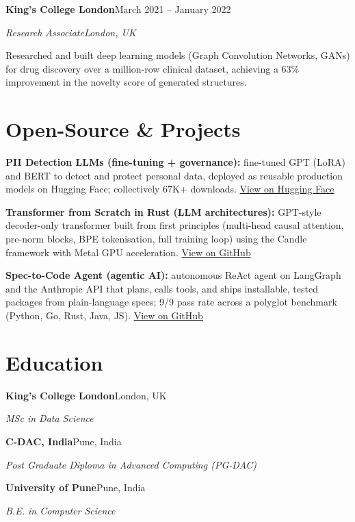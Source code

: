 \documentclass[10pt,a4paper]{article}
\newcommand{\entry}[4]{%
  {\color{company}\bfseries #1}\hfill {\color{muted}#2}\par
  \vspace{1pt}
  {\itshape #3}\hfill {\color{muted}\itshape #4}\par
  \vspace{3pt}%
}
\begin{document}
\entry{King's College London}{March 2021 -- January 2022}{Research Associate}{London, UK}
\begin{tight}
  \item Researched and built deep learning models (Graph Convolution Networks, GANs) for drug discovery over a million-row clinical dataset, achieving a 63\% improvement in the novelty score of generated structures.
\end{tight}

\section{Open-Source \& Projects}
\begin{tight}
  \item \textbf{PII Detection LLMs (fine-tuning + governance):} fine-tuned GPT (LoRA) and BERT to detect and protect personal data, deployed as reusable production models on Hugging Face; collectively 67K+ downloads. \href{https://huggingface.co/ab-ai/pii_model}{View on Hugging Face}
  \item \textbf{Transformer from Scratch in Rust (LLM architectures):} GPT-style decoder-only transformer built from first principles (multi-head causal attention, pre-norm blocks, BPE tokenisation, full training loop) using the Candle framework with Metal GPU acceleration. \href{https://github.com/abhijeetscode/transformer-rust}{View on GitHub}
  \item \textbf{Spec-to-Code Agent (agentic AI):} autonomous ReAct agent on LangGraph and the Anthropic API that plans, calls tools, and ships installable, tested packages from plain-language specs; 9/9 pass rate across a polyglot benchmark (Python, Go, Rust, Java, JS). \href{https://github.com/abhijeetscode/Spec-to-Code-Agent}{View on GitHub}
\end{tight}

\section{Education}
{\color{company}\bfseries King's College London}\hfill {\color{muted}London, UK}\par
{\itshape MSc in Data Science}\par\vspace{2pt}
{\color{company}\bfseries C-DAC, India}\hfill {\color{muted}Pune, India}\par
{\itshape Post Graduate Diploma in Advanced Computing (PG-DAC)}\par\vspace{2pt}
{\color{company}\bfseries University of Pune}\hfill {\color{muted}Pune, India}\par
{\itshape B.E. in Computer Science}\par
\end{document}
